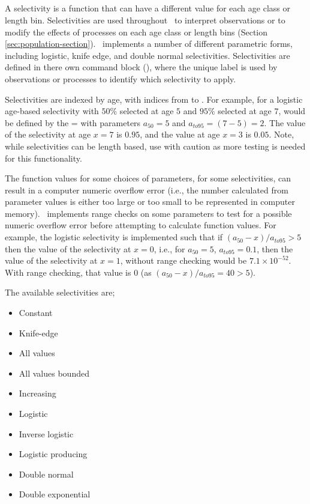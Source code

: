 \subsection{\label{sec:selectivities}}
A selectivity is a function that can have a different value for each age class or length bin. Selectivities are used throughout \IBM\ to interpret observations or to modify the effects of processes on each age class or length bins (Section \ref{sec:population-section}). \IBM\ implements a number of different parametric forms, including logistic, knife edge, and double normal selectivities. Selectivities are defined in there own command block (), where the unique label is used by observations or processes to identify which selectivity to apply.

Selectivities are indexed by age, with indices from  to . For example, for a logistic age-based selectivity with $50\%$ selected at age $5$ and $95\%$ selected at age $7$, would be defined by the = with parameters $a_{50}=5$ and $a_{to95}=(7-5)=2$. The value of the selectivity at age $x=7$ is $0.95$, and the value at age $x=3$ is $0.05$. Note, while selectivities can be length based, use with caution as more testing is needed for this functionality.

The function values for some choices of parameters, for some selectivities, can result in a computer numeric overflow error (i.e., the number calculated from parameter values is either too large or too small to be represented in computer memory). \IBM\ implements range checks on some parameters to test for a possible numeric overflow error before attempting to calculate function values. For example, the logistic selectivity is implemented such that if $(a_{50}-x)/a_{to95} > 5$ then the value of the selectivity at $x=0$, i.e., for $a_{50}=5$, $a_{to95}=0.1$, then the value of the selectivity at $x=1$, without range checking would be $7.1 \times 10^{-52}$. With range checking, that value is $0$ (as $(a_{50}-x)/a_{to95}=40 > 5$).

The available selectivities are;

\begin{itemize}
  \item Constant
  \item Knife-edge
  \item All values
  \item All values bounded
  \item Increasing
  \item Logistic
  \item Inverse logistic
  \item Logistic producing
  \item Double normal
  \item Double exponential
\end{itemize}

